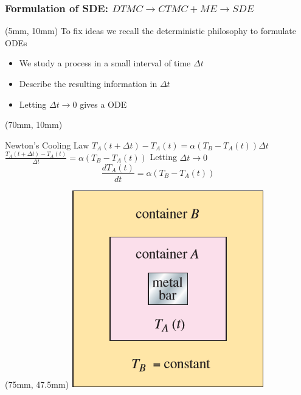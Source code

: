 \begin{frame}
    \frametitle{Formulation of SDE: $DTMC \to CTMC + ME \to SDE$}
    \begin{textblock*}{50mm}(5mm, 10mm)
        To fix ideas we recall the deterministic 
        philosophy to formulate ODEs
        \begin{itemize}
            \item 
                We study a process in a small interval of
                time $\Delta t$
            \item
                Describe the resulting information in $\Delta t$
            \item
                Letting $\Delta t \to 0$ gives a ODE
        \end{itemize}
    \end{textblock*}
%
%
%
    \begin{textblock*}{50mm}(70mm, 10mm)
        \begin{exampleblock}{Newton's Cooling Law}
            $
                T_A(t + \Delta t) - T_A(t) = 
                    \alpha (T_B - T_A(t)) \Delta t
            $
            $   \displaystyle
                \frac{T_A(t + \Delta t) - T_A(t)}{\Delta t}
                = \alpha (T_B - T_A(t)) 
            $
            Letting $\Delta t \to 0$
            $$   \displaystyle
                \frac{dT_A(t)}{dt}
                = \alpha (T_B - T_A(t))
            $$
        \end{exampleblock}
    \end{textblock*}
    \begin{textblock*}{60mm}(75mm, 47.5mm)
        \includegraphics[width=0.7\linewidth]{assets/newton_cooling_law}
    \end{textblock*}
\end{frame}
